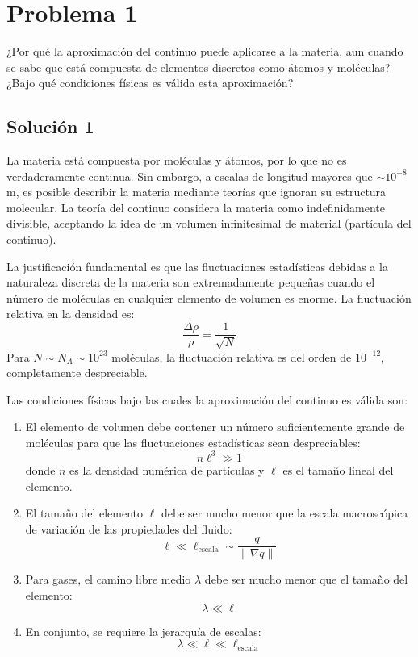 \documentclass[a4paper]{article}
\begin{document}
\tableofcontents

\section{Problema 1}
¿Por qué la aproximación del continuo puede aplicarse a la materia, aun cuando se sabe que está compuesta de elementos discretos como átomos y moléculas? ¿Bajo qué condiciones físicas es válida esta aproximación?

\subsection{Solución 1}

La materia está compuesta por moléculas y átomos, por lo que no es verdaderamente continua. Sin embargo, a escalas de longitud mayores que $\sim 10^{-8}$ m, es posible describir la materia mediante teorías que ignoran su estructura molecular. La teoría del continuo considera la materia como indefinidamente divisible, aceptando la idea de un volumen infinitesimal de material (partícula del continuo).

La justificación fundamental es que las fluctuaciones estadísticas debidas a la naturaleza discreta de la materia son extremadamente pequeñas cuando el número de moléculas en cualquier elemento de volumen es enorme. La fluctuación relativa en la densidad es:
$$
\frac{\Delta \rho}{\rho} = \frac{1}{\sqrt{N}}
$$
Para $N \sim N_A \sim 10^{23}$ moléculas, la fluctuación relativa es del orden de $10^{-12}$, completamente despreciable.

Las condiciones físicas bajo las cuales la aproximación del continuo es válida son:

\begin{enumerate}
    \item El elemento de volumen debe contener un número suficientemente grande de moléculas para que las fluctuaciones estadísticas sean despreciables:
$$
n\ell^3 \gg 1
$$
donde $n$ es la densidad numérica de partículas y $\ell$ es el tamaño lineal del elemento.

    \item El tamaño del elemento $\ell$ debe ser mucho menor que la escala macroscópica de variación de las propiedades del fluido:
$$
\ell \ll \ell_{\text{escala}} \sim \frac{q}{\|\nabla q\|}
$$

    \item Para gases, el camino libre medio $\lambda$ debe ser mucho menor que el tamaño del elemento:
$$
\lambda \ll \ell
$$

    \item En conjunto, se requiere la jerarquía de escalas:
$$
\lambda \ll \ell \ll \ell_{\text{escala}}
$$
\end{enumerate}
\end{document}
